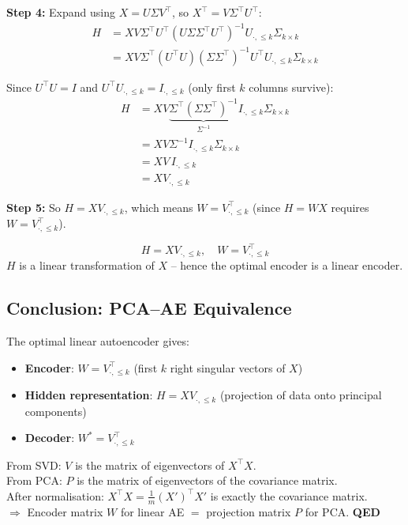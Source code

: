 \documentclass[12pt,a4paper]{article}
\begin{document}
\textbf{Step 4:} Expand using $X = U\Sigma V^\top$, so $X^\top = V\Sigma^\top U^\top$:
\begin{align*}
  H &= XV\Sigma^\top U^\top (U\Sigma\Sigma^\top U^\top)^{-1} U_{\cdot,\leq k}\Sigma_{k\times k}\\
    &= XV\Sigma^\top (U^\top U)(\Sigma\Sigma^\top)^{-1} U^\top U_{\cdot,\leq k}\Sigma_{k\times k}
\end{align*}

Since $U^\top U = I$ and $U^\top U_{\cdot,\leq k} = I_{\cdot,\leq k}$ (only first $k$ columns survive):
\begin{align*}
  H &= XV\underbrace{\Sigma^\top(\Sigma\Sigma^\top)^{-1}}_{\Sigma^{-1}} I_{\cdot,\leq k}\Sigma_{k\times k}\\
    &= XV\Sigma^{-1}I_{\cdot,\leq k}\Sigma_{k\times k}\\
    &= XV\,I_{\cdot,\leq k}\\
    &= XV_{\cdot,\leq k}
\end{align*}

\textbf{Step 5:} So $H = XV_{\cdot,\leq k}$, which means $W = V_{\cdot,\leq k}^\top$ (since $H = WX$ requires $W = V_{\cdot,\leq k}^\top$).

\begin{theorembox}
\[
  \boxed{H = XV_{\cdot,\leq k},\quad W = V_{\cdot,\leq k}^\top}
\]
$H$ is a linear transformation of $X$ -- hence the optimal encoder is a linear encoder.
\end{theorembox}

\subsection{Conclusion: PCA--AE Equivalence}

The optimal linear autoencoder gives:
\begin{itemize}
  \item \textbf{Encoder}: $W = V_{\cdot,\leq k}^\top$ (first $k$ right singular vectors of $X$)
  \item \textbf{Hidden representation}: $H = XV_{\cdot,\leq k}$ (projection of data onto principal components)
  \item \textbf{Decoder}: $W^* = V_{\cdot,\leq k}^\top$
\end{itemize}

\begin{theorembox}[title={PCA--AE Equivalence Proof}]
From SVD: $V$ is the matrix of eigenvectors of $X^\top X$.\\
From PCA: $P$ is the matrix of eigenvectors of the covariance matrix.\\
After normalisation: $X^\top X = \frac{1}{m}(X')^\top X'$ is exactly the covariance matrix.\\
$\Rightarrow$ Encoder matrix $W$ for linear AE $=$ projection matrix $P$ for PCA. \hfill\textbf{QED}
\end{theorembox}
\end{document}

